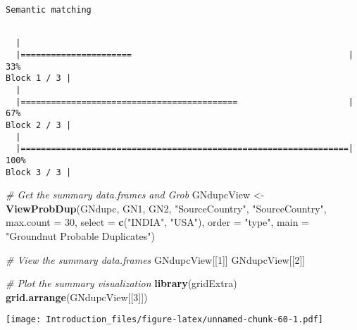 \documentclass[]{article}
\newenvironment{Shaded}{\begin{snugshade}}{\end{snugshade}}
\newcommand{\CommentTok}[1]{\textcolor[rgb]{0.56,0.35,0.01}{\textit{#1}}}
\newcommand{\DataTypeTok}[1]{\textcolor[rgb]{0.13,0.29,0.53}{#1}}
\newcommand{\DecValTok}[1]{\textcolor[rgb]{0.00,0.00,0.81}{#1}}
\newcommand{\KeywordTok}[1]{\textcolor[rgb]{0.13,0.29,0.53}{\textbf{#1}}}
\newcommand{\NormalTok}[1]{#1}
\newcommand{\StringTok}[1]{\textcolor[rgb]{0.31,0.60,0.02}{#1}}
\begin{document}
\begin{verbatim}
Semantic matching
\end{verbatim}

\begin{verbatim}

  |                                                                       
  |======================                                           |  33%
Block 1 / 3 |
  |                                                                       
  |===========================================                      |  67%
Block 2 / 3 |
  |                                                                       
  |=================================================================| 100%
Block 3 / 3 |
\end{verbatim}

\begin{Shaded}
\begin{Highlighting}[]
\CommentTok{# Get the summary data.frames and Grob}
\NormalTok{GNdupcView <-}\StringTok{ }\KeywordTok{ViewProbDup}\NormalTok{(GNdupc, GN1, GN2, }\StringTok{"SourceCountry"}\NormalTok{, }\StringTok{"SourceCountry"}\NormalTok{,}
                         \DataTypeTok{max.count =} \DecValTok{30}\NormalTok{, }\DataTypeTok{select =} \KeywordTok{c}\NormalTok{(}\StringTok{"INDIA"}\NormalTok{, }\StringTok{"USA"}\NormalTok{), }\DataTypeTok{order =} \StringTok{"type"}\NormalTok{,}
                         \DataTypeTok{main =} \StringTok{"Groundnut Probable Duplicates"}\NormalTok{)}
\end{Highlighting}
\end{Shaded}

\begin{Shaded}
\begin{Highlighting}[]
\CommentTok{# View the summary data.frames}
\NormalTok{GNdupcView[[}\DecValTok{1}\NormalTok{]]}
\NormalTok{GNdupcView[[}\DecValTok{2}\NormalTok{]]}
\end{Highlighting}
\end{Shaded}

\begin{Shaded}
\begin{Highlighting}[]
\CommentTok{# Plot the summary visualization}
\KeywordTok{library}\NormalTok{(gridExtra)}
\KeywordTok{grid.arrange}\NormalTok{(GNdupcView[[}\DecValTok{3}\NormalTok{]])}
\end{Highlighting}
\end{Shaded}

\texttt{[image: Introduction\_files/figure-latex/unnamed-chunk-60-1.pdf]}
\end{document}
